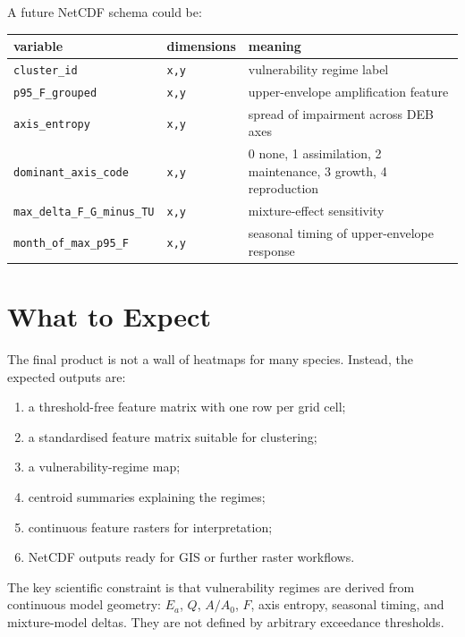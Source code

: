 \documentclass[11pt]{article}
\begin{document}
A future NetCDF schema could be:
\begin{center}
\small
\begin{tabular}{lll}
\toprule
variable & dimensions & meaning\\
\midrule
\texttt{cluster\_id} & \texttt{x,y} & vulnerability regime label\\
\texttt{p95\_F\_grouped} & \texttt{x,y} & upper-envelope amplification feature\\
\texttt{axis\_entropy} & \texttt{x,y} & spread of impairment across DEB axes\\
\texttt{dominant\_axis\_code} & \texttt{x,y} & 0 none, 1 assimilation, 2 maintenance, 3 growth, 4 reproduction\\
\texttt{max\_delta\_F\_G\_minus\_TU} & \texttt{x,y} & mixture-effect sensitivity\\
\texttt{month\_of\_max\_p95\_F} & \texttt{x,y} & seasonal timing of upper-envelope response\\
\bottomrule
\end{tabular}
\end{center}

\section{What to Expect}
The final product is not a wall of heatmaps for many species. Instead, the expected outputs are:
\begin{enumerate}
\item a threshold-free feature matrix with one row per grid cell;
\item a standardised feature matrix suitable for clustering;
\item a vulnerability-regime map;
\item centroid summaries explaining the regimes;
\item continuous feature rasters for interpretation;
\item NetCDF outputs ready for GIS or further raster workflows.
\end{enumerate}

The key scientific constraint is that vulnerability regimes are derived from continuous model geometry: $E_a$, $Q$, $A/A_0$, $F$, axis entropy, seasonal timing, and mixture-model deltas. They are not defined by arbitrary exceedance thresholds.
\end{document}
